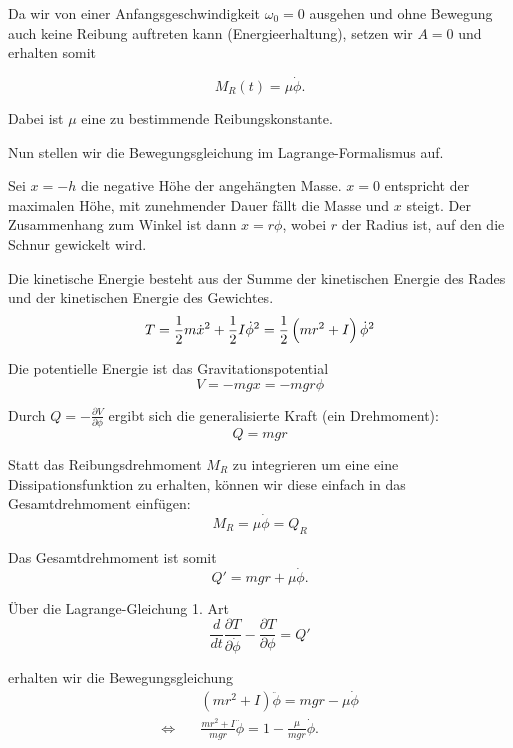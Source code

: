 \documentclass[a4paper,german,12pt,smallheadings]{scrartcl}
\begin{document}
Da wir von einer Anfangsgeschwindigkeit $\omega_0=0$ ausgehen und ohne Bewegung
auch keine Reibung auftreten kann (Energieerhaltung), setzen wir $A=0$ und
erhalten somit

\begin{equation}
  M_R(t) = \mu \dot{\phi}.
\end{equation}

Dabei ist $\mu$ eine zu bestimmende Reibungskonstante.

Nun stellen wir die Bewegungsgleichung im Lagrange-Formalismus auf.

Sei $x = -h$ die negative Höhe der angehängten Masse. $x=0$ entspricht der
maximalen Höhe, mit zunehmender Dauer fällt die Masse und $x$ steigt. Der
Zusammenhang zum Winkel ist dann $x = r \phi$, wobei $r$ der Radius ist, auf
den die Schnur gewickelt wird.

Die kinetische Energie besteht aus der Summe der kinetischen Energie des Rades
und der kinetischen Energie des Gewichtes.
\begin{equation}
  T = \frac{1}{2} m \dot{x}^2 + \frac{1}{2} I \dot{\phi}^2 = \frac{1}{2} \del{m r^2 + I} \dot{\phi}^2
\end{equation}

Die potentielle Energie ist das Gravitationspotential
\begin{equation}
  V = -mgx = -mgr \phi
\end{equation}

Durch $Q = -\frac{\partial V}{\partial \phi}$ ergibt sich die generalisierte
Kraft (ein Drehmoment):
\begin{equation}
  Q = mgr
\end{equation}

Statt das Reibungsdrehmoment $M_R$ zu integrieren um eine eine
Dissipationsfunktion zu erhalten, können wir diese einfach in das
Gesamtdrehmoment einfügen:
\begin{equation}
  M_R = \mu \dot{\phi} = Q_R
\end{equation}

Das Gesamtdrehmoment ist somit
\begin{equation}
  Q' = mgr + \mu \dot{\phi}.
\end{equation}

Über die Lagrange-Gleichung 1. Art
\begin{equation}
  \frac{d}{dt} \frac{\partial T}{\partial \dot{\phi}} - \frac{\partial T}{\partial \phi} = Q'
\end{equation}

erhalten wir die Bewegungsgleichung
\begin{align*}
  &(mr^2+I) \ddot{\phi} = mgr - \mu \dot{\phi} \\
  \Leftrightarrow \quad
  &\frac{mr^2+I}{mgr} \ddot{\phi} = 1 - \frac{\mu}{mgr} \dot{\phi}.
\end{align*}
\end{document}
